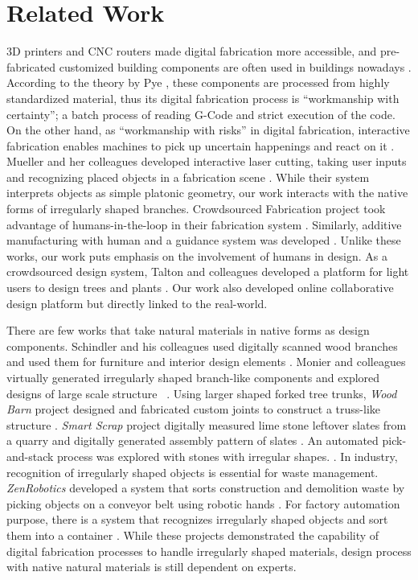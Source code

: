 \section{Related Work}
3D printers and CNC routers made digital fabrication more accessible, and pre-fabricated customized building components are often used in buildings nowadays \cite{knaack2012prefabricated}.
According to the theory by Pye , these components are processed from highly standardized material, thus its digital fabrication process is ``workmanship with certainty''; a batch process of reading G-Code and strict execution of the code.
On the other hand, as ``workmanship with risks'' in digital fabrication, interactive fabrication enables machines to pick up uncertain happenings and react on it \cite{willis2011interactive}.
Mueller and her colleagues developed interactive laser cutting, taking user inputs and recognizing placed objects in a fabrication scene \cite{Mueller:2012:ICI:2380116.2380191}.
While their system interprets objects as simple platonic geometry, our work interacts with the native forms of irregularly shaped branches.
Crowdsourced Fabrication project took advantage of humans-in-the-loop in their fabrication system \cite{lafreniere2016crowdsourced}.
Similarly, additive manufacturing with human and a guidance system was developed \cite{Yoshida:2015:AHA:2809654.2766951}.
Unlike these works, our work puts emphasis on the involvement of humans in design.
As a crowdsourced design system, Talton and colleagues developed a platform for light users to design trees and plants \cite{talton2009exploratory}.
Our work also developed online collaborative design platform but directly linked to the real-world.

There are few works that take natural materials in native forms as design components.
Schindler and his colleagues used digitally scanned wood branches and used them for furniture and interior design elements \cite{schindler2014processing}.
Monier and colleagues virtually generated irregularly shaped branch-like components and explored designs of large scale structure ~\cite{monier2013use}.
Using larger shaped forked tree trunks, \textit{Wood Barn} project designed and fabricated custom joints to construct a truss-like structure \cite{woodbarn}.
\textit{Smart Scrap} project digitally measured lime stone leftover slates from a quarry and digitally generated assembly pattern of slates \cite{smartscrap}.
An automated pick-and-stack process was explored with stones with irregular shapes. \cite{stonestacking}.
In industry, recognition of irregularly shaped objects is essential for waste management.
\textit{ZenRobotics} developed a system that sorts construction and demolition waste by picking objects on a conveyor belt using robotic hands \cite{lukka2014zenrobotics}.
For factory automation purpose, there is a system that recognizes irregularly shaped objects and sort them into a container \cite{sujan2000design}.
While these projects demonstrated the capability of digital fabrication processes to handle irregularly shaped materials, design process with native natural materials is still dependent on experts.

